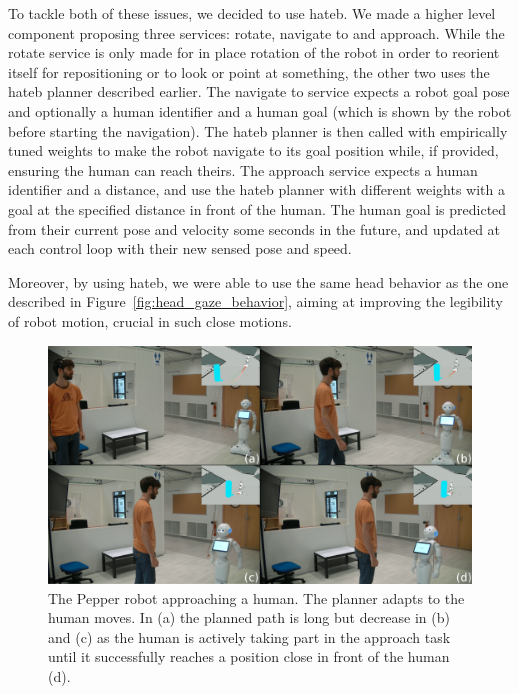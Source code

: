 \documentclass[a4paper,11pt,twoside]{StyleThese}
\begin{document}
To tackle both of these issues, we decided to use \acrshort{hateb}. We made a higher level component proposing three services: rotate, navigate to and approach. While the rotate service is only made for in place rotation of the robot in order to reorient itself for repositioning or to look or point at something, the other two uses the \acrshort{hateb} planner described earlier. The navigate to service expects a robot goal pose and optionally a human identifier and a human goal (which is shown by the robot before starting the navigation). The \acrshort{hateb} planner is then called with empirically tuned weights to make the robot navigate to its goal position while, if provided, ensuring the human can reach theirs. The approach service expects a human identifier and a distance, and use the \acrshort{hateb} planner with different weights with a goal at the specified distance in front of the human. The human goal is predicted from their current pose and velocity some seconds in the future, and updated at each control loop with their new sensed pose and speed.

Moreover, by using \acrshort{hateb}, we were able to use the same head behavior as the one described in Figure~\ref{fig:head_gaze_behavior}, aiming at improving the legibility of robot motion, crucial in such close motions.

\begin{figure}[hbtp]
\centering
\includegraphics[width=\textwidth]{figures/chapter2/approach.png}
\caption{The Pepper robot approaching a human. The planner adapts to the human moves. In (a) the planned path is long but decrease in (b) and (c) as the human is actively taking part in the approach task until it successfully reaches a position close in front of the human (d).}
\label{fig:approach}
\end{figure}
\end{document}
